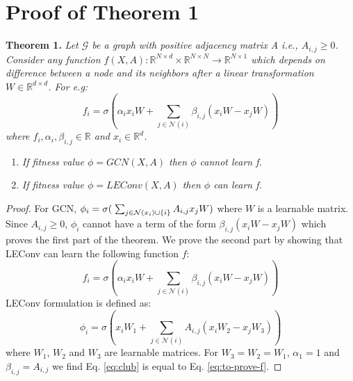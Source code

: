 \documentclass[letterpaper]{article} \usepackage{aaai20}  \usepackage{times}  \usepackage{helvet} \usepackage{courier}  \usepackage[hyphens]{url}  \usepackage{graphicx} \urlstyle{rm} \def\UrlFont{\rm}  \usepackage{graphicx}  \frenchspacing  \setlength{\pdfpagewidth}{8.5in}  \setlength{\pdfpageheight}{11in}
\begin{document}
	\section{Proof of Theorem 1}
	\label{ssec:gconv-proof}
\textbf{Theorem 1.}
	\textit{
		Let $\mathcal{G}$ be a graph with positive adjacency matrix A i.e., $A_{i, j}\geq0$. Consider any function $f(X, A): \mathbb{R}^{N \times d} \times \mathbb{R}^{N \times N} \rightarrow \mathbb{R}^{N \times 1}$ which depends on difference between a node and its neighbors after a linear transformation $W \in \mathbb{R}^{d \times d}$. For e.g:}
	\begin{equation}
	\nonumber
	f_{i} = \sigma(\alpha_{i}x_{i}W + \sum_{j \in \mathcal{N}(i)} \beta_{i,j} (x_{i}W - x_{j}W))
	\end{equation}
	\textit{
		where $f_{i}, \alpha_{i}, \beta_{i,j} \in \mathbb{R}$ and $ x_{i} \in \mathbb{R}^{d}$.
	}
	\begin{enumerate}[label=\alph*)]
		\item \textit{If fitness value $\phi = GCN(X, A)$ then $\phi$ cannot learn f.}
		\item \textit{If fitness value $\phi = LEConv(X, A)$ then $\phi$ can learn f.}
	\end{enumerate}
	
	\begin{proof}
		For GCN, $\phi_{i} = \sigma(\hspace{1mm} \sum_{j \in \mathcal{N}(x_{i}) \cup \{i\}} A_{i, j} x_{j}W)$ where $W$ is a learnable matrix. Since $A_{i, j} \geq 0$, $\phi_{i}$ cannot have a term of the form $\beta_{i,j} (x_{i}W - x_{j}W)$ which proves the first part of the theorem. We prove the second part by showing that LEConv can learn the following function $f$: 
		\begin{equation}
		\label{eq:to-prove-f}
		f_{i} = \sigma(\alpha_{i}x_{i}W + \sum_{j \in \mathcal{N}(i)} \beta_{i,j} (x_{i}W - x_{j}W))
		\end{equation}
		LEConv formulation is defined as:
\begin{equation}
		\label{eq:club}
		\phi_{i} = \sigma(x_{i} W_{1} + \sum_{j \in \mathcal{N}(i)} A_{i,j} (x_{i} W_{2} - x_{j} W_{3}))
		\end{equation}
		where $W_{1}$, $W_{2}$ and $W_{3}$ are learnable matrices. For $W_{3} = W_{2} = W_{1}$, $\alpha_{1} = 1$ and $\beta_{i,j} = A_{i,j}$  we find Eq. \eqref{eq:club} is equal to Eq. \eqref{eq:to-prove-f}.
	\end{proof}
	
	
	
\end{document}
